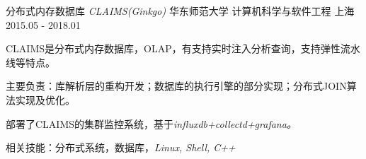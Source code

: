 \begin{cventries}
  \cventry
    {分布式内存数据库  \it{CLAIMS(Ginkgo)}  } 
    {华东师范大学 \quad 计算机科学与软件工程}
    {上海}
    {2015.05 - 2018.01}
    {
      \begin{cvitems}
	\item {CLAIMS是分布式内存数据库，OLAP，有支持实时注入分析查询，支持弹性流水线等特点。}
	\item {主要负责：库解析层的重构开发；数据库的执行引擎的部分实现；分布式JOIN算法实现及优化。}
	\item {部署了CLAIMS的集群监控系统，基于\it{influxdb+collectd+grafana}。}
	\item {相关技能：分布式系统，数据库，\it{Linux, Shell, C++}}
      \end{cvitems}
    }
\end{cventries}
